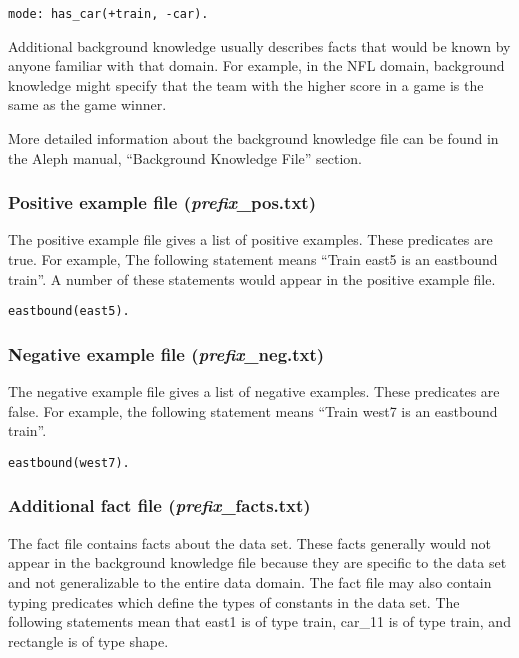 \documentclass{article}
\begin{document}
\begin{verbatim}
mode: has_car(+train, -car).
\end{verbatim}

Additional background knowledge usually describes facts that would be known by anyone familiar with that domain.  For example, in the NFL domain, background knowledge might specify that the team with the higher score in a game is the same as the game winner.

More detailed information about the background knowledge file can be found in the Aleph manual, ``Background Knowledge File'' section.~\cite{alephbkfile}


\subsubsection{Positive example file (\emph{prefix}\_pos.txt)}

The positive example file gives a list of positive examples.  These predicates are true. For example, The following statement means ``Train east5 is an eastbound train''.  A number of these statements would appear in the positive example file.

\begin{verbatim}
eastbound(east5).
\end{verbatim}

\subsubsection{Negative example file (\emph{prefix}\_neg.txt)}

The negative example file gives a list of negative examples.  These predicates are false. For example, the following statement means ``Train west7 is an eastbound train''.

\begin{verbatim}
eastbound(west7).
\end{verbatim}

\subsubsection{Additional fact file (\emph{prefix}\_facts.txt)}

The fact file contains facts about the data set.  These facts generally would not appear in the background knowledge
file because they are specific to the data set and not generalizable to the entire data domain.
The fact file may also contain typing predicates which define the types of constants in the data set.
The following statements mean that east1 is of type train, car\_11 is of type train, and rectangle is of type shape.
\end{document}
